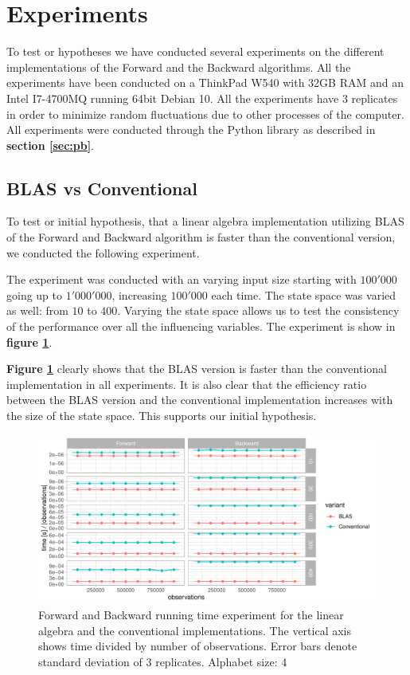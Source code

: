 \section{Experiments}\label{sec:expriments}
To test or hypotheses we have conducted several experiments on the different implementations of the Forward and the Backward algorithms. All the experiments have been conducted on a ThinkPad W540 with 32GB RAM and an Intel I7-4700MQ running 64bit Debian 10. All the experiments have 3 replicates in order to minimize random fluctuations due to other processes of the computer.
All experiments were conducted through the Python library as described in \textbf{section \ref{sec:pb}}.

\subsection{BLAS vs Conventional}\label{sec:A1}
To test or initial hypothesis, that a linear algebra implementation utilizing BLAS of the Forward and Backward algorithm is faster than the conventional version, we conducted the following experiment.

The experiment was conducted with an varying input size starting with $100'000$ going up to $1'000'000$, increasing $100'000$ each time. The state space was varied as well: from $10$ to $400$. Varying the state space allows us to test the consistency of the performance over all the influencing variables. The experiment is show in \textbf{figure \ref{fig:A1}}. 

\textbf{Figure \ref{fig:A1}} clearly shows that the BLAS version is faster than the conventional implementation in all experiments. It is also clear that the efficiency ratio between the BLAS version and the conventional implementation increases with the size of the state space. This supports our initial hypothesis. 

\begin{figure}[H]
  \centering
  \includegraphics[scale=0.85]{figures/figure_A1.pdf}
  \caption{\small{Forward and Backward running time experiment for the linear algebra and the conventional implementations. The vertical axis shows time divided by number of observations. Error bars denote standard deviation of 3 replicates. Alphabet size: 4}}
  \label{fig:A1}
\end{figure}

